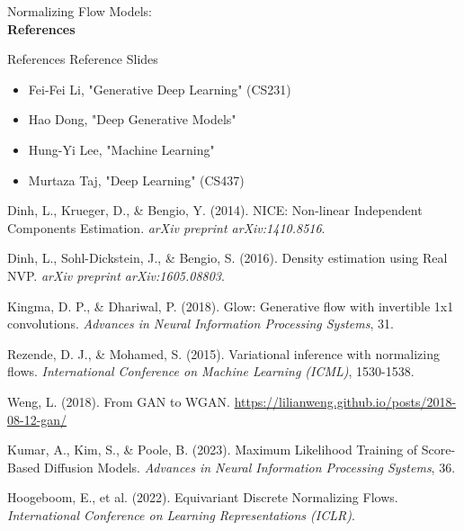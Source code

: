 \begin{frame}[allowframebreaks]{}
    \LARGE Normalizing Flow Models: \\[1.5ex] \textbf{References}
\end{frame}

\begin{frame}[allowframebreaks]{References}
    Reference Slides
\begin{itemize}
    \item Fei-Fei Li, "Generative Deep Learning" (CS231)
    \item Hao Dong, "Deep Generative Models"
    \item Hung-Yi Lee, "Machine Learning"
    \item Murtaza Taj, "Deep Learning" (CS437)
\end{itemize}
\framebreak
    
    \begin{thebibliography}{99}

    Dinh, L., Krueger, D., \& Bengio, Y. (2014).
    NICE: Non-linear Independent Components Estimation.
    \textit{arXiv preprint arXiv:1410.8516}.

    Dinh, L., Sohl-Dickstein, J., \& Bengio, S. (2016).
    Density estimation using Real NVP.
    \textit{arXiv preprint arXiv:1605.08803}.

    Kingma, D. P., \& Dhariwal, P. (2018).
    Glow: Generative flow with invertible 1x1 convolutions.
    \textit{Advances in Neural Information Processing Systems}, 31.

    Rezende, D. J., \& Mohamed, S. (2015).
    Variational inference with normalizing flows.
    \textit{International Conference on Machine Learning (ICML)}, 1530-1538.

    Weng, L. (2018).
    From GAN to WGAN.
    \url{https://lilianweng.github.io/posts/2018-08-12-gan/}

    Kumar, A., Kim, S., \& Poole, B. (2023).
    Maximum Likelihood Training of Score-Based Diffusion Models.
    \textit{Advances in Neural Information Processing Systems}, 36.

    Hoogeboom, E., et al. (2022).
    Equivariant Discrete Normalizing Flows.
    \textit{International Conference on Learning Representations (ICLR)}.


\end{thebibliography}
\end{frame}
